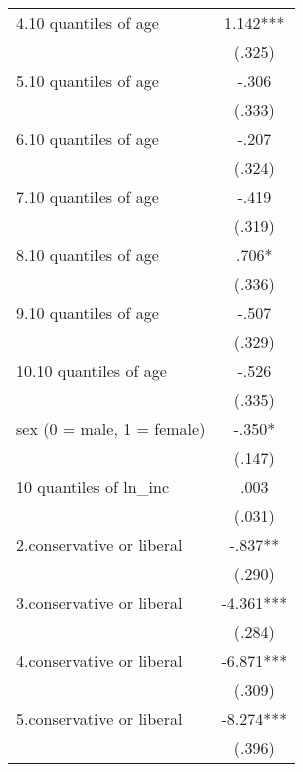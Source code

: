\documentclass[12pt]{article}
\begin{document}
\begin{enumerate}
\begin{table}
\begin{tabular}{l*{1}{c}}
4.10 quantiles of age                             &       1.142***\\
                                                  &      (.325)   \\
5.10 quantiles of age                             &       -.306   \\
                                                  &      (.333)   \\
6.10 quantiles of age                             &       -.207   \\
                                                  &      (.324)   \\
7.10 quantiles of age                             &       -.419   \\
                                                  &      (.319)   \\
8.10 quantiles of age                             &        .706*  \\
                                                  &      (.336)   \\
9.10 quantiles of age                             &       -.507   \\
                                                  &      (.329)   \\
10.10 quantiles of age                            &       -.526   \\
                                                  &      (.335)   \\
sex (0 = male, 1 = female)                        &       -.350*  \\
                                                  &      (.147)   \\
10 quantiles of ln\_inc                            &        .003   \\
                                                  &      (.031)   \\
2.conservative or liberal                         &       -.837** \\
                                                  &      (.290)   \\
3.conservative or liberal                         &      -4.361***\\
                                                  &      (.284)   \\
4.conservative or liberal                         &      -6.871***\\
                                                  &      (.309)   \\
5.conservative or liberal                         &      -8.274***\\
                                                  &      (.396)   \\


\end{tabular}
\end{table}
\end{enumerate}
\end{document}
